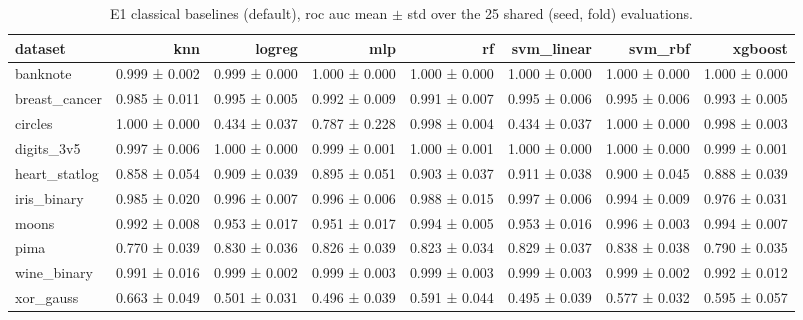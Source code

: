 \begin{table}[ht]
\centering
\caption{E1 classical baselines (default), roc auc mean $\pm$ std over the 25 shared (seed, fold) evaluations.}
\label{tab:e1-default-roc_auc}
\begin{tabular}{lrrrrrrr}
\toprule
dataset & knn & logreg & mlp & rf & svm\_linear & svm\_rbf & xgboost \\
\midrule
banknote & 0.999 ± 0.002 & 0.999 ± 0.000 & 1.000 ± 0.000 & 1.000 ± 0.000 & 1.000 ± 0.000 & 1.000 ± 0.000 & 1.000 ± 0.000 \\
breast\_cancer & 0.985 ± 0.011 & 0.995 ± 0.005 & 0.992 ± 0.009 & 0.991 ± 0.007 & 0.995 ± 0.006 & 0.995 ± 0.006 & 0.993 ± 0.005 \\
circles & 1.000 ± 0.000 & 0.434 ± 0.037 & 0.787 ± 0.228 & 0.998 ± 0.004 & 0.434 ± 0.037 & 1.000 ± 0.000 & 0.998 ± 0.003 \\
digits\_3v5 & 0.997 ± 0.006 & 1.000 ± 0.000 & 0.999 ± 0.001 & 1.000 ± 0.001 & 1.000 ± 0.000 & 1.000 ± 0.000 & 0.999 ± 0.001 \\
heart\_statlog & 0.858 ± 0.054 & 0.909 ± 0.039 & 0.895 ± 0.051 & 0.903 ± 0.037 & 0.911 ± 0.038 & 0.900 ± 0.045 & 0.888 ± 0.039 \\
iris\_binary & 0.985 ± 0.020 & 0.996 ± 0.007 & 0.996 ± 0.006 & 0.988 ± 0.015 & 0.997 ± 0.006 & 0.994 ± 0.009 & 0.976 ± 0.031 \\
moons & 0.992 ± 0.008 & 0.953 ± 0.017 & 0.951 ± 0.017 & 0.994 ± 0.005 & 0.953 ± 0.016 & 0.996 ± 0.003 & 0.994 ± 0.007 \\
pima & 0.770 ± 0.039 & 0.830 ± 0.036 & 0.826 ± 0.039 & 0.823 ± 0.034 & 0.829 ± 0.037 & 0.838 ± 0.038 & 0.790 ± 0.035 \\
wine\_binary & 0.991 ± 0.016 & 0.999 ± 0.002 & 0.999 ± 0.003 & 0.999 ± 0.003 & 0.999 ± 0.003 & 0.999 ± 0.002 & 0.992 ± 0.012 \\
xor\_gauss & 0.663 ± 0.049 & 0.501 ± 0.031 & 0.496 ± 0.039 & 0.591 ± 0.044 & 0.495 ± 0.039 & 0.577 ± 0.032 & 0.595 ± 0.057 \\
\bottomrule
\end{tabular}
\end{table}
